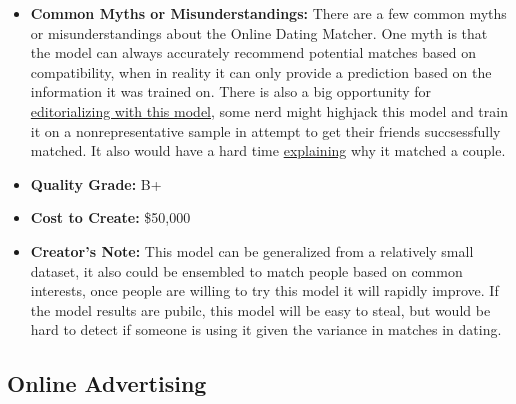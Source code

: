 \begin{itemize}
    \item \textbf{Common Myths or Misunderstandings:} There are a few common myths or misunderstandings about the Online Dating Matcher. One myth is that the model can always accurately recommend potential matches based on compatibility, when in reality it can only provide a prediction based on the information it was trained on. There is also a big opportunity for \hyperref[sec:janitor]{editorializing with this model}, some nerd might highjack this model and train it on a nonrepresentative sample in attempt to get their friends succsessfully matched. It also would have a hard time \hyperref[sec:explain]{explaining} why it matched a couple.
    \item \textbf{Quality Grade:} B+
    \item \textbf{Cost to Create:} \$50,000
    \item \textbf{Creator's Note:} This model can be generalized from a relatively small dataset, it also could be ensembled to match people based on common interests, once people are willing to try this model it will rapidly improve. If the model results are pubilc, this model will be easy to steal, but would be hard to detect if someone is using it given the variance in matches in dating.
\end{itemize}

\subsection{Online Advertising}


